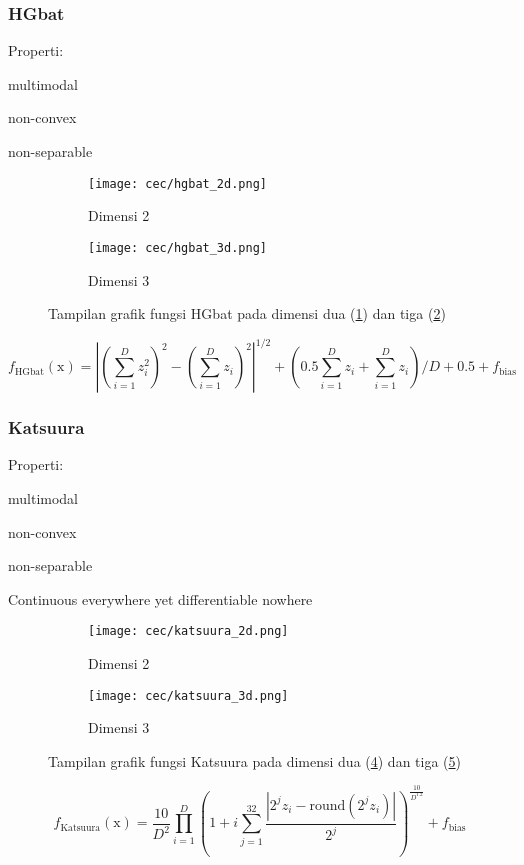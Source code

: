 \subsubsection{HGbat}
\noindent Properti:
\begin{packed_item}
  \item multimodal
  \item non-convex
  \item non-separable
\end{packed_item}
\begin{figure}[H]
	\centering
	\begin{subfigure}[b]{0.4\textwidth}
		\centering
		\texttt{[image: cec/hgbat\_2d.png]}
		\caption{Dimensi 2}
		\label{fig:hgbat-2d}
	\end{subfigure}
	\hfill
	\begin{subfigure}[b]{0.4\textwidth}
		\centering
		\texttt{[image: cec/hgbat\_3d.png]}
		\caption{Dimensi 3}
		\label{fig:hgbat-3d}
	\end{subfigure}
	\caption{Tampilan grafik fungsi HGbat pada dimensi dua (\cref{fig:hgbat-2d}) dan tiga (\cref{fig:hgbat-3d})}
	\label{fig:hgbat}
\end{figure}
\begin{equation}
  f_{\text{HGbat}}(\mathrm{x})=\left|\left( \sum_{i=1}^{D}z_i^2\right)^2-\left(\sum_{i=1}^{D}z_i \right)^2  \right|^{1/2}+\left(0.5\sum_{i=1}^{D}z_i+\sum_{i=1}^{D}z_i \right)/D+0.5+f_{\text{bias}}
\end{equation}

\subsubsection{Katsuura}
\noindent Properti:
\begin{packed_item}
  \item multimodal
  \item non-convex
  \item non-separable
  \item Continuous everywhere yet differentiable nowhere
\end{packed_item}
\begin{figure}[H]
	\centering
	\begin{subfigure}[b]{0.4\textwidth}
		\centering
		\texttt{[image: cec/katsuura\_2d.png]}
		\caption{Dimensi 2}
		\label{fig:katsuura-2d}
	\end{subfigure}
	\hfill
	\begin{subfigure}[b]{0.4\textwidth}
		\centering
		\texttt{[image: cec/katsuura\_3d.png]}
		\caption{Dimensi 3}
		\label{fig:katsuura-3d}
	\end{subfigure}
	\caption{Tampilan grafik fungsi Katsuura pada dimensi dua (\cref{fig:katsuura-2d}) dan tiga (\cref{fig:katsuura-3d})}
	\label{fig:katsuura}
\end{figure}
\begin{equation}
  f_{\text{Katsuura}}(\mathrm{x})=\frac{10}{D^2}\prod_{i=1}^{D}\left( 1+i\sum_{j=1}^{32}\frac{\left|2^j z_i-\text{round}\left( 2^jz_i\right)  \right| }{2^j}\right)^{\frac{10}{D^{1.2}}}+f_{\text{bias}}
\end{equation}


